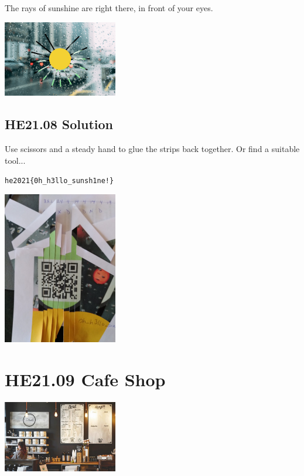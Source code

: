 \documentclass[english,a4paper,nols,noindent]{tufte-handout}
\begin{document}
\noindent The rays of sunshine are right there, in front of your eyes.

\begin{marginfigure}
    \includegraphics[width=50mm]{ch08/sunshine.png}
\end{marginfigure}

\hypertarget{he21.08-solution}{%
\subsection{HE21.08 Solution}\label{he21.08-solution}}

Use scissors and a steady hand to glue the strips back together. Or find a suitable tool...

\verb+he2021{0h_h3llo_sunsh1ne!}+
\begin{marginfigure}
    \includegraphics[width=50mm]{ch08/solution08.jpg}
\end{marginfigure}

\hypertarget{he21.09}{%
\section{HE21.09 Cafe Shop}\label{he21.09}}
\begin{marginfigure}
    \includegraphics[width=50mm]{images/challenge9.jpg}
\end{marginfigure}
\end{document}
